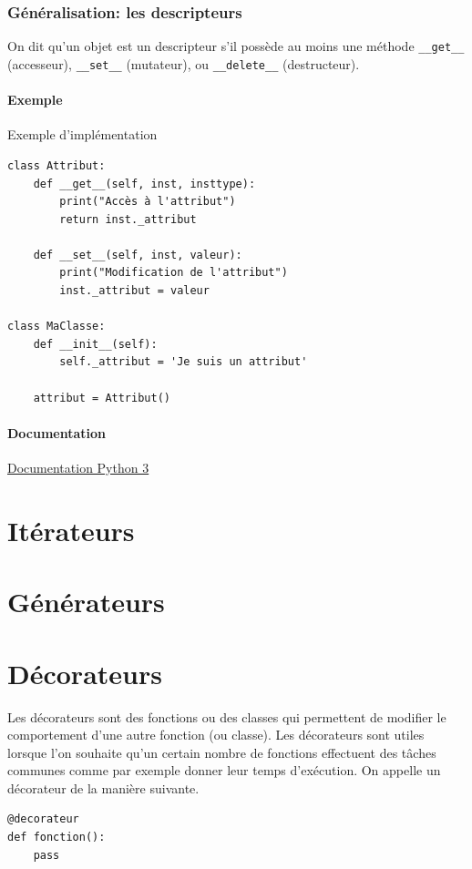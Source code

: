 \documentclass[a4paper, 10pt]{article}
\newcommand{\code}[1]{{\small\texttt{#1}}}
\begin{document}
\subsubsection{Généralisation: les descripteurs}
On dit qu'un objet est un descripteur s'il possède au moins une méthode \code{\_\_get\_\_} (accesseur), \code{\_\_set\_\_} (mutateur), ou \code{\_\_delete\_\_} (destructeur).

\paragraph{Exemple} Exemple d'implémentation
\begin{verbatim}
class Attribut:
    def __get__(self, inst, insttype):
        print("Accès à l'attribut")
        return inst._attribut

    def __set__(self, inst, valeur):
        print("Modification de l'attribut")
        inst._attribut = valeur

class MaClasse:
    def __init__(self):
        self._attribut = 'Je suis un attribut'

    attribut = Attribut()
\end{verbatim}

\paragraph{Documentation} \href{https://docs.python.org/3/howto/descriptor.html}{Documentation Python 3}

\section{Itérateurs}
\section{Générateurs}
\section{Décorateurs}
Les décorateurs sont des fonctions ou des classes qui permettent de modifier le comportement d'une autre fonction (ou classe). Les décorateurs sont utiles lorsque l'on souhaite qu'un certain nombre de fonctions effectuent des tâches communes comme par exemple donner leur temps d'exécution. On appelle un décorateur de la manière suivante.

\begin{verbatim}
@decorateur
def fonction():
    pass
\end{verbatim}
\end{document}
